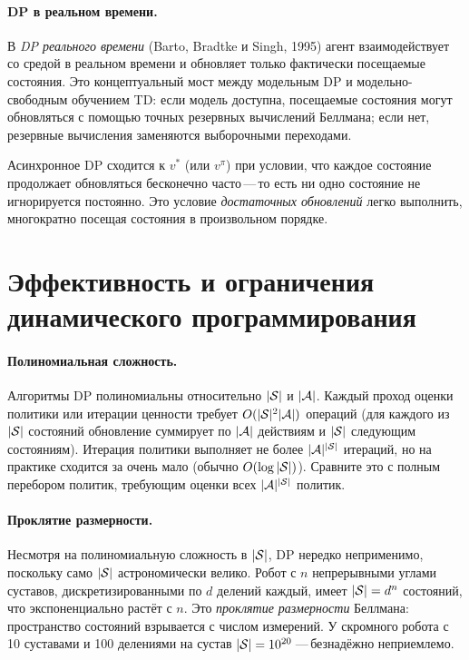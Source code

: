\paragraph{DP в реальном времени.}
В \emph{DP реального времени} (Barto, Bradtke и Singh, 1995) агент взаимодействует со средой в реальном времени и обновляет только фактически посещаемые состояния.  Это концептуальный мост между модельным DP и модельно-свободным обучением TD: если модель доступна, посещаемые состояния могут обновляться с помощью точных резервных вычислений Беллмана; если нет, резервные вычисления заменяются выборочными переходами.

\begin{remark}
Асинхронное DP сходится к $v^*$ (или $v^\pi$) при условии, что каждое состояние продолжает обновляться бесконечно часто\,---\,то есть ни одно состояние не игнорируется постоянно.  Это условие \emph{достаточных обновлений} легко выполнить, многократно посещая состояния в произвольном порядке.
\end{remark}

\section{Эффективность и ограничения динамического программирования}
\label{sec:dp-limitations}

\paragraph{Полиномиальная сложность.}
Алгоритмы DP полиномиальны относительно $|\mathcal{S}|$ и $|\mathcal{A}|$.  Каждый проход оценки политики или итерации ценности требует $O(|\mathcal{S}|^2 |\mathcal{A}|)$ операций (для каждого из $|\mathcal{S}|$ состояний обновление суммирует по $|\mathcal{A}|$ действиям и $|\mathcal{S}|$ следующим состояниям).  Итерация политики выполняет не более $|\mathcal{A}|^{|\mathcal{S}|}$ итераций, но на практике сходится за очень мало (обычно $O(\log |\mathcal{S}|)$).  Сравните это с полным перебором политик, требующим оценки всех $|\mathcal{A}|^{|\mathcal{S}|}$ политик.

\paragraph{Проклятие размерности.}
Несмотря на полиномиальную сложность в $|\mathcal{S}|$, DP нередко неприменимо, поскольку само $|\mathcal{S}|$ астрономически велико.  Робот с $n$ непрерывными углами суставов, дискретизированными по $d$ делений каждый, имеет $|\mathcal{S}| = d^n$ состояний, что экспоненциально растёт с $n$.  Это \emph{проклятие размерности} Беллмана: пространство состояний взрывается с числом измерений.  У скромного робота с 10 суставами и 100 делениями на сустав $|\mathcal{S}| = 10^{20}$\,---\,безнадёжно неприемлемо.

